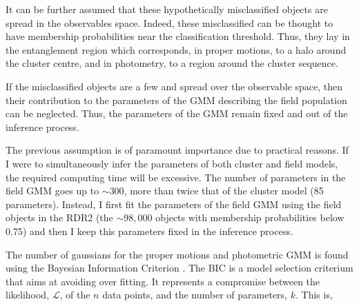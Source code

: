 It can be further assumed that these hypothetically misclassified objects are spread in the observables space. Indeed, these misclassified can be thought to have membership probabilities near the classification threshold. Thus, they lay in the entanglement region which corresponds, in proper motions, to a halo around the cluster centre, and in photometry, to a region around the cluster sequence.


If the misclassified objects are a few and spread over the observable space, then their contribution to the parameters of the GMM describing the field population can be neglected. Thus, the parameters of the GMM remain fixed and out of the inference process. 

The previous assumption is of paramount importance due to practical reasons. If I were to simultaneously infer the parameters of both cluster and field models, the required computing time will be excessive. The number of parameters in the field GMM goes up to $\sim 300$, more than twice that of the cluster model (85 parameters). Instead, I first fit the parameters of the field GMM using the field objects in the RDR2 (the $\sim 98,000$ objects with membership probabilities below 0.75) and then I keep this parameters fixed in the inference process.   

The number of gaussians for the proper motions and photometric GMM is found using the Bayesian Information Criterion \cite[BIC,][]{Schwarz1978}. The BIC is a model selection criterium that aims at avoiding over fitting. It represents a compromise between the likelihood, $\mathcal{L}$, of the $n$ data points, and the number of parameters, $k$. This is,

